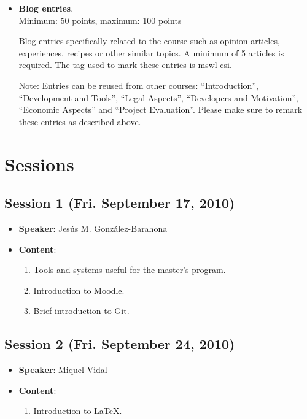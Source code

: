 \documentclass[a4paper]{article}
\begin{document}
\begin{itemize}

\item \textbf{Blog entries}. \\
  Minimum: 50 points, maximum: 100 points

  Blog entries specifically related to the course such as opinion articles, experiences, 
recipes or other similar topics. A minimum of 5 articles is required. The tag used to mark
these entries is mswl-csi.

 Note: Entries can be reused from other courses: ``Introduction'', ``Development and Tools'',
``Legal Aspects'', ``Developers and Motivation'', ``Economic Aspects'' and ``Project Evaluation''. 
Please make sure to remark these entries as described above.

\end{itemize}


\section{Sessions}

\subsection{Session 1 (Fri. September 17, 2010)}

\begin{itemize}
 \item \textbf{Speaker}: Jesús M. González-Barahona

 \item \textbf{Content}:

  \begin{enumerate}
   \item Tools and systems useful for the master's program.
   \item Introduction to Moodle.
   \item Brief introduction to Git.
  \end{enumerate}

\end{itemize}

\subsection{Session 2 (Fri. September 24, 2010)}

\begin{itemize}
 \item \textbf{Speaker}: Miquel Vidal

 \item \textbf{Content}:

  \begin{enumerate}
   \item Introduction to LaTeX.
  \end{enumerate}

\end{itemize}
\end{document}
